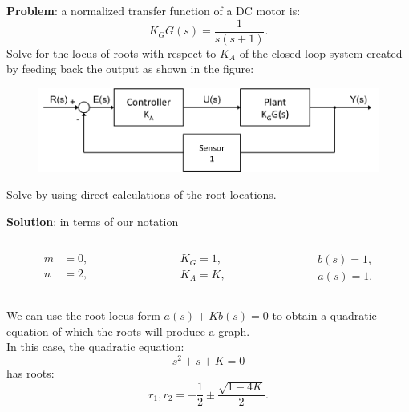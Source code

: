 \begin{frame}
	\begin{example}
		\textbf{Problem}: a normalized transfer function of a DC motor is:
		\begin{equation}
		K_GG(s) = \frac{1}{s(s+1)}.
 		\end{equation}
 		Solve for the locus of roots with respect to $K_A$ of the closed-loop system created by feeding back the output as shown in the figure:
 		\begin{figure}
 			\centering
 			\includegraphics[width=0.8\linewidth]{closed_loop_diagram}
 		\end{figure}
 		Solve by using direct calculations of the root locations.
	\end{example}
\end{frame}

\begin{frame}
	\begin{exampleblock}{}
		\textbf{Solution}: in terms of our notation
		\vspace{-0.5em}
		\begin{columns}
			\begin{column}{0.2\textwidth}
				\begin{align*}
				m &=0,\\
				n &=2,
				\end{align*}
			\end{column}
			\begin{column}{0.2\textwidth}
				\begin{align*}
				K_G =1,\\
				K_A =K,
				\end{align*}
			\end{column}
			\begin{column}{0.2\textwidth}
				\begin{align*}
				b(s) =1,\\
				a(s) = 1.
				\end{align*}
			\end{column}
		\end{columns}
		\vspace{1em}
		We can use the root-locus form $a(s) + Kb(s) = 0$ to obtain a quadratic equation of which the roots will produce a graph.\\ 
		In this case, the quadratic equation:
		\begin{equation}
		s^2 + s + K = 0
		\end{equation}
		has roots:
		\begin{equation}
		r_1,r_2 = -\frac{1}{2} \pm \frac{\sqrt{1 - 4K}}{2}.
		\end{equation}
	\end{exampleblock}
\end{frame}

